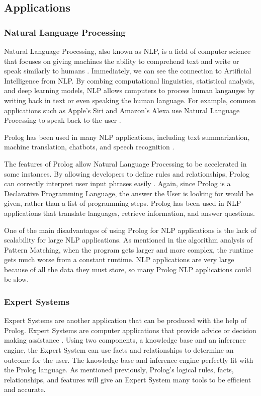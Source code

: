 \documentclass{article}
\theoremstyle{theorem}
\theoremstyle{definition}
\theoremstyle{remark}
\begin{document}
\subsection{Applications}

\subsubsection{Natural Language Processing}
\noindent\newline Natural Language Processing, also known as NLP, is a field of computer science that focuses on giving machines the ability to comprehend text and write or speak similarly to humans \cite{(20)}. Immediately, we  can see the connection to Artificial Intelligence from NLP. By combing computational linguistics, statistical analysis, and deep learning models, NLP allows computers to process human langauges by writing back in text or even speaking the human language. For example, common applications such as Apple's Siri and Amazon's Alexa use Natural Language Processing to speak back to the user \cite{(21)}.

\noindent\newline Prolog has been used in many NLP applications, including text summarization, machine translation, chatbots, and speech recognition \cite{(22)}.

\noindent\newline The features of Prolog allow Natural Language Processing to be accelerated in some instances. By allowing developers to define rules and relationships, Prolog can correctly interpret user input phrases easily \cite{(23)}. Again, since Prolog is a Declarative Programming Language, the answer the User is looking for would be given, rather than a list of programming steps. Prolog has been used in NLP applications that translate languages, retrieve information, and answer questions. 

\noindent\newline One of the main disadvantages of using Prolog for NLP applications is the lack of scalability for large NLP applications. As mentioned in the algorithm analysis of Pattern Matching, when the program gets larger and more complex, the runtime gets much worse from a constant runtime. NLP applications are very large because of all the data they must store, so many Prolog NLP applications could be slow. 

\subsubsection{Expert Systems}
\noindent\newline Expert Systems are another application that can be produced with the help of Prolog. Expert Systems are computer applications that provide advice or decision making assistance \cite{(24)}. Using two components, a knowledge base and an inference engine, the Expert System can use facts and relationships to determine an outcome for the user. The knowledge base and inference engine perfectly fit with the Prolog language. As mentioned previously, Prolog's logical rules, facts, relationships, and features will give an Expert System many tools to be efficient and accurate. 
\end{document}
